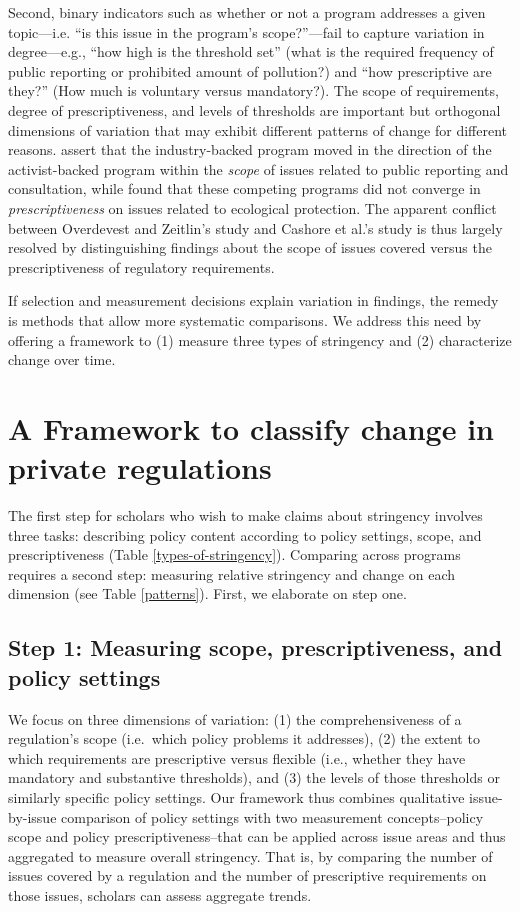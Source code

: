 \documentclass[
      12pt,
            Review ]{article}
\begin{document}
Second, binary indicators such as whether or not a program addresses a
given topic---i.e. ``is this issue in the program's scope?''---fail to
capture variation in degree---e.g., ``how high is the threshold set''
(what is the required frequency of public reporting or prohibited amount
of pollution?) and ``how prescriptive are they?'' (How much is voluntary
versus mandatory?). The scope of requirements, degree of
prescriptiveness, and levels of thresholds are important but orthogonal
dimensions of variation that may exhibit different patterns of change
for different reasons. \citet{Overdevest2014} assert that the
industry-backed program moved in the direction of the activist-backed
program within the \emph{scope} of issues related to public reporting
and consultation, while \citet{Cashore2004} found that these competing
programs did not converge in \emph{prescriptiveness} on issues related
to ecological protection. The apparent conflict between Overdevest and
Zeitlin's study and Cashore et al.'s study is thus largely resolved by
distinguishing findings about the scope of issues covered versus the
prescriptiveness of regulatory requirements.

If selection and measurement decisions explain variation in findings,
the remedy is methods that allow more systematic comparisons. We address
this need by offering a framework to (1) measure three types of
stringency and (2) characterize change over time.

\section{A Framework to classify change in private
regulations}\label{a-framework-to-classify-change-in-private-regulations}

The first step for scholars who wish to make claims about stringency
involves three tasks: describing policy content according to policy
settings, scope, and prescriptiveness (Table \ref{types-of-stringency}).
Comparing across programs requires a second step: measuring relative
stringency and change on each dimension (see Table \ref{patterns}).
First, we elaborate on step one.

\subsection{Step 1: Measuring scope, prescriptiveness, and policy
settings}\label{step-1-measuring-scope-prescriptiveness-and-policy-settings}

We focus on three dimensions of variation: (1) the comprehensiveness of
a regulation's scope (i.e.~which policy problems it addresses), (2) the
extent to which requirements are prescriptive versus flexible (i.e.,
whether they have mandatory and substantive thresholds), and (3) the
levels of those thresholds or similarly specific policy settings. Our
framework thus combines qualitative issue-by-issue comparison of policy
settings with two measurement concepts--policy scope and policy
prescriptiveness--that can be applied across issue areas and thus
aggregated to measure overall stringency. That is, by comparing the
number of issues covered by a regulation and the number of prescriptive
requirements on those issues, scholars can assess aggregate trends.
\end{document}
